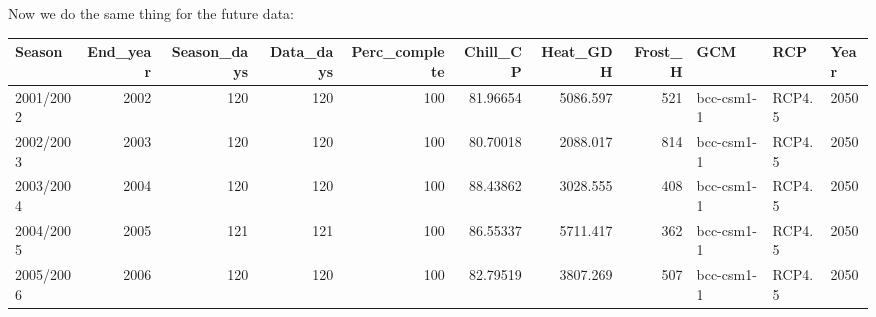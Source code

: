 \documentclass[
]{book}
\newenvironment{Shaded}{\begin{snugshade}}{\end{snugshade}}
\newcommand{\CommentTok}[1]{\textcolor[rgb]{0.56,0.35,0.01}{\textit{#1}}}
\newcommand{\ControlFlowTok}[1]{\textcolor[rgb]{0.13,0.29,0.53}{\textbf{#1}}}
\newcommand{\DataTypeTok}[1]{\textcolor[rgb]{0.13,0.29,0.53}{#1}}
\newcommand{\DecValTok}[1]{\textcolor[rgb]{0.00,0.00,0.81}{#1}}
\newcommand{\KeywordTok}[1]{\textcolor[rgb]{0.13,0.29,0.53}{\textbf{#1}}}
\newcommand{\NormalTok}[1]{#1}
\newcommand{\OperatorTok}[1]{\textcolor[rgb]{0.81,0.36,0.00}{\textbf{#1}}}
\newcommand{\StringTok}[1]{\textcolor[rgb]{0.31,0.60,0.02}{#1}}
\begin{document}
Now we do the same thing for the future data:

\begin{Shaded}
\end{Shaded}

\begingroup\fontsize{8}{10}\selectfont

\begin{tabular}{l|r|r|r|r|r|r|r|l|l|l}
\hline
Season & End\_year & Season\_days & Data\_days & Perc\_complete & Chill\_CP & Heat\_GDH & Frost\_H & GCM & RCP & Year\\
\hline
2001/2002 & 2002 & 120 & 120 & 100 & 81.96654 & 5086.597 & 521 & bcc-csm1-1 & RCP4.5 & 2050\\
\hline
2002/2003 & 2003 & 120 & 120 & 100 & 80.70018 & 2088.017 & 814 & bcc-csm1-1 & RCP4.5 & 2050\\
\hline
2003/2004 & 2004 & 120 & 120 & 100 & 88.43862 & 3028.555 & 408 & bcc-csm1-1 & RCP4.5 & 2050\\
\hline
2004/2005 & 2005 & 121 & 121 & 100 & 86.55337 & 5711.417 & 362 & bcc-csm1-1 & RCP4.5 & 2050\\
\hline
2005/2006 & 2006 & 120 & 120 & 100 & 82.79519 & 3807.269 & 507 & bcc-csm1-1 & RCP4.5 & 2050\\
\hline
\end{tabular}
\endgroup{}
\end{document}
